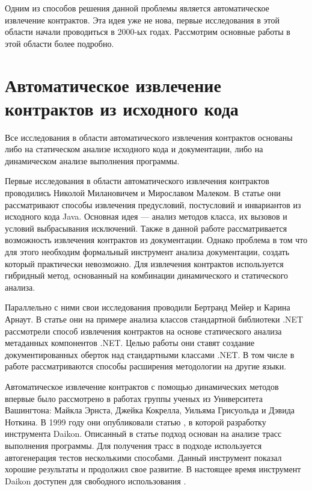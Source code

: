 Одним из способов решения данной проблемы является автоматическое извлечение контрактов. Эта идея уже не нова, первые исследования в этой области начали проводиться в 2000-ых годах. Рассмотрим основные работы в этой области более подробно.

\section{Автоматическое извлечение контрактов из исходного кода}
Все исследования в области автоматического извлечения контрактов основаны либо на статическом анализе исходного кода и документации, либо на динамическом анализе выполнения программы.

Первые исследования в области автоматического извлечения контрактов проводились Николой Милановичем и Мирославом Малеком. В статье  \cite{extractingContractsFromJava} они рассматривают способы извлечения предусловий, постусловий и инвариантов из исходного кода Java. Основная идея --- анализ методов класса, их вызовов и условий выбрасывания исключений. Также в данной работе рассматривается возможность извлечения контрактов из документации. Однако проблема в том что для этого необходим формальный инструмент анализа документации, создать который практически невозможно. Для извлечения контрактов используется гибридный метод, основанный на комбинации динамического и статического анализа.

Параллельно с ними свои исследования проводили Бертранд Мейер и Карина Арнаут. В статье \cite{uncoveringHiddenContracts} они на примере анализа классов стандартной библиотеки .NET рассмотрели способ извлечения контрактов на основе статического анализа метаданных компонентов .NET. Целью работы они ставят создание документированных оберток над стандартными классами .NET. В том числе в работе рассматриваются способы расширения методологии на другие языки. 

Автоматическое извлечение контрактов с помощью динамических методов впервые было рассмотрено в работах группы ученых из Университета Вашингтона: Майкла Эрнста, Джейка Кокрелла, Уильяма Грисуольда и Дэвида Ноткина. В 1999 году они опубликовали статью \cite{discoveringInvariants}, в которой разработку инструмента Daikon. Описанный в статье подход основан на анализе трасс выполнения программы. Для получения трасс в подходе используется автогенерация тестов несколькими способами. Данный инструмент показал хорошие результаты и продолжил свое развитие. В настоящее время инструмент Daikon доступен для свободного использования \cite{daikon}.

